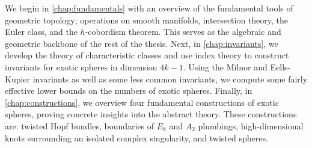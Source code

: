 We begin in \cref{chap:fundamentals} with an overview of the fundamental tools of geometric topology; operations on smooth manifolds, intersection theory, the Euler class, and the $h$-cobordism theorem. This serves as the algebraic and geometric backbone of the rest of the thesis.
Next, in \cref{chap:invariants}, we develop the theory of characteristic classes and use index theory to construct invariants for exotic spheres in dimension $4k-1$. Using the Milnor and Eells-Kupier invariants as well as some less common invariants, we compute some fairly effective lower bounds on the numbers of exotic spheres. 
Finally, in \cref{chap:constructions}, we overview four fundamental constructions of exotic spheres, proving concrete insights into the abstract theory.
These constructions are: twisted Hopf bundles, boundaries of $E_8$ and $A_2$ plumbings, high-dimensional knots surrounding an isolated complex singularity, and twisted spheres. 

%
%
%
%

